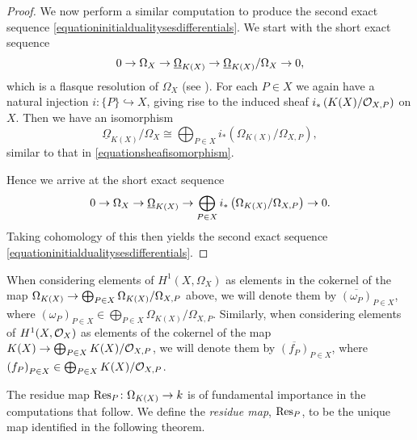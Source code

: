 \begin{proof}
    We now perform a similar computation to produce the second exact sequence \eqref{equationinitialdualitysesdifferentials}.
    We start with the short exact sequence
        \[
        0 \rightarrow \Omega_X \rightarrow \underline{\Omega}_{K(X)} \rightarrow \underline{\Omega}_{K(X)}/\Omega_X \rightarrow 0,
        \]
    which is a flasque resolution of $\Omega_X$ (see \cite[Chap.\ II, ex.\ 1.16]{hart}).
    For each $P \in X$ we again have a natural injection $i \colon \{ P \} \hookrightarrow X$, giving rise to the induced sheaf $i_*\left( K(X)/{\cal O}_{X,P} \right)$ on $X$.
    Then we have an isomorphism
        \begin{equation}\label{equationsheafisomorphismdifferentials}
        \underline{\Omega}_{K(X)}/\Omega_X \cong \bigoplus_{P \in X} i_* \left( \Omega_{K(X)}/\Omega_{X,P}\right),
        \end{equation}
    similar to that in \eqref{equationsheafisomorphism}.

    Hence we arrive at the short exact sequence
        \begin{equation}\label{equationshortexactsequencedifferentialsdirectsum}
        0 \rightarrow \Omega_X \rightarrow \underline{\Omega}_{K(X)} \rightarrow \bigoplus_{P \in X} i_* \left( \Omega_{K(X)}/\Omega_{X,P} \right)  \rightarrow 0.
        \end{equation}
    Taking cohomology of this then yields the second exact sequence \eqref{equationinitialdualitysesdifferentials}.
    \end{proof}

    \begin{rem}
        When considering elements of $H^1(X,\Omega_X)$ as elements in the cokernel of the map $\Omega_{K(X)} \rightarrow \bigoplus_{P \in X}\Omega_{K(X)}/\Omega_{X,P}$ above, we will denote them by $\overline{(\omega_P)}_{P \in X}$, where ${(\omega_P)}_{P \in X}\in \bigoplus_{P \in X}\Omega_{K(X)}/\Omega_{X,P}$.
        Similarly, when considering elements of $H^1(X,\mathcal{O}_X)$ as elements of the cokernel of the map $K(X) \rightarrow \bigoplus_{P \in X}K(X)/{\cal O}_{X,P}$, we will denote them by $\overline{(f_P)}_{P \in X}$, where ${(f_P)}_{P \in X} \in \bigoplus_{P \in X}K(X)/{\cal O}_{X,P}$.
    \end{rem}

The residue map $\operatorname{Res}_P \colon \Omega_{K(X)} \rightarrow k$ is of fundamental importance in the computations that follow.
We define the {\em residue map}, $\operatorname{Res}_P$, to be the unique map identified in the following theorem.

